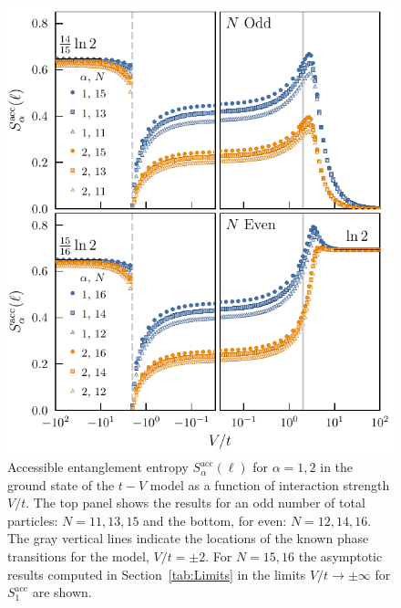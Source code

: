 %
\begin{figure}[h!]
\begin{center}
\includegraphics[scale=1.0]{operationalEntanglementEntropies_SOP5.pdf}
\end{center}
\caption{Accessible entanglement entropy $S_{\alpha}^{\mathrm{acc}}(\ell)$ for $\alpha = 1, 2$ in the ground state of the $t-V$ model as a function of interaction strength $V/t$. The top panel shows the results for an odd number of total particles: $N=11,13,15$ and the bottom, for even: $N=12,14,16$. The gray vertical lines indicate the locations of the known phase transitions for the model, $V/t = \pm 2$. For $N=15,16$ the asymptotic results computed in Section~\ref{tab:Limits} in the limits $V/t \to \pm \infty$ for $S_{1}^{\mathrm{acc}}$ are shown.}
\label{fig:OEE}
 \end{figure}


